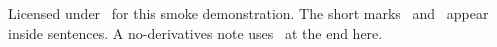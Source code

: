 \documentclass{article}
\begin{document}
Licensed under \bysa\ for this smoke demonstration.
The short marks \by\ and \nc\ appear inside sentences.
A no-derivatives note uses \nd\ at the end here.
\end{document}
